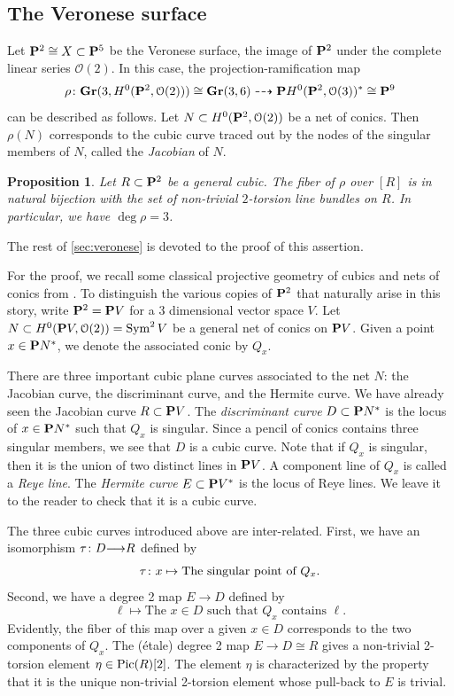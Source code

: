 \documentclass[11pt,reqno]{amsart}
\theoremstyle{plain}
\newtheorem{proposition}[theorem]{Proposition}
\theoremstyle{definition}
\theoremstyle{remark}
\numberwithin{equation}{section}
\renewcommand{\to}{{\longrightarrow}}
\numberwithin{equation}{section}
\renewcommand{\O}{\mathcal O}
\begin{document}
\subsection{The Veronese surface} %
\label{sec:veronese}
Let $\P^{2} \cong X \subset \P^{5}$ be the Veronese surface, the image of $\P^2$ under the complete linear series $\O(2)$.
In this case, the projection-ramification map
\begin{align*}
  \rho \from  \Gr(3,H^0(\P^2, \O(2))) \cong \Gr(3, 6) \dashrightarrow \P H^0(\P^2, \O(3))^* \cong \P^9
\end{align*}
can be described as follows.
Let $N \subset H^0(\P^2, \O(2))$ be a net of conics.
Then $\rho(N)$ corresponds to the cubic curve traced out by the nodes of the singular members of $N$, called the \emph{Jacobian} of $N$.
\begin{proposition}\label{prop:veronese}
  Let $R \subset \P^2$ be a general cubic.
  The fiber of $\rho$ over $[R]$ is in natural bijection with the set of non-trivial $2$-torsion line bundles on $R$.
  In particular, we have $\deg \rho = 3$.
\end{proposition}
The rest of \autoref{sec:veronese} is devoted to the proof of this assertion.

For the proof, we recall some classical projective geometry of cubics and nets of conics from \cite[\S~3]{dol:12}.
To distinguish the various copies of $\P^2$ that naturally arise in this story, write $\P^2 = \P V$ for a 3 dimensional vector space $V$.
Let $N \subset H^0(\P V, \O(2)) = \Sym^2V$ be a general net of conics on $\P V$.
Given a point $x \in \P N^*$, we denote the associated conic by $Q_x$.

There are three important cubic plane curves associated to the net $N$: the Jacobian curve, the discriminant curve, and the Hermite curve.
We have already seen the Jacobian curve $R \subset \P V$.
The \emph{discriminant curve} $D \subset \P N^*$ is the locus of $x \in \P N^*$ such that $Q_x$ is singular.
Since a pencil of conics contains three singular members, we see that $D$ is a cubic curve.
Note that if $Q_x$ is singular, then it is the union of two distinct lines in $\P V$.
A component line of $Q_x$ is called a \emph{Reye line}.
The \emph{Hermite curve} $E \subset \P V^*$ is the locus of Reye lines.
We leave it to the reader to check that it is a cubic curve.

The three cubic curves introduced above are inter-related.
First, we have an isomorphism $\tau \from D \to R$ defined by
\begin{equation}\label{eqn:DR}
  \tau \from x \mapsto \text{The singular point of $Q_x$}.
\end{equation}
Second, we have a degree 2 map $E \to D$ defined by
\[ \ell \mapsto \text{The $x \in D$ such that $Q_x$ contains $\ell$}.\]
Evidently, the fiber of this map over a given $x \in D$ corresponds to the two components of $Q_x$.
The (\'etale) degree 2 map $E \to D \cong R$ gives a non-trivial 2-torsion element $\eta \in \Pic(R)[2]$.
The element $\eta$ is characterized by the property that it is the unique non-trivial 2-torsion element whose pull-back to $E$ is trivial.
\end{document}
